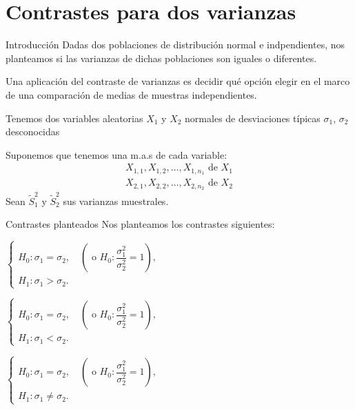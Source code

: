 \documentclass[
  ignorenonframetext,
]{beamer}
\begin{document}
\hypertarget{contrastes-para-dos-varianzas}{%
\section{Contrastes para dos
varianzas}\label{contrastes-para-dos-varianzas}}

\begin{frame}{Introducción}
\protect\hypertarget{introducciuxf3n-4}{}
Dadas dos poblaciones de distribución normal e indpendientes, nos
planteamos si las varianzas de dichas poblaciones son iguales o
diferentes.

Una aplicación del contraste de varianzas es decidir qué opción elegir
en el marco de una comparación de medias de muestras independientes.

Tenemos dos variables aleatorias \(X_1\) y \(X_2\) normales de
desviaciones típicas \(\sigma_1\), \(\sigma_2\) desconocidas

Suponemos que tenemos una m.a.s de cada variable: \[
\begin{array}{l}
X_{1,1}, X_{1,2},\ldots, X_{1,n_1}\mbox{ de }X_1\\
X_{2,1}, X_{2,2},\ldots, X_{2,n_2}\mbox{ de }X_2
\end{array}
\] Sean \(\widetilde{S}_1^2\) y \(\widetilde{S}_2^2\) sus varianzas
muestrales.
\end{frame}

\begin{frame}{Contrastes planteados}
\protect\hypertarget{contrastes-planteados}{}
Nos planteamos los contrastes siguientes:

\(\left\{\begin{array}{l} H_0:\sigma_1=\sigma_2, \quad \left(\mbox{ o } H_0:\dfrac{\sigma_1^2}{\sigma_2^2}=1\right),\\ H_1:\sigma_1 > \sigma_2. \end{array} \right.\)

\(\left\{\begin{array}{l} H_0:\sigma_1=\sigma_2, \quad \left(\mbox{ o } H_0:\dfrac{\sigma_1^2}{\sigma_2^2}=1\right),\\ H_1:\sigma_1 < \sigma_2. \end{array} \right.\)

\(\left\{\begin{array}{l} H_0:\sigma_1=\sigma_2, \quad \left(\mbox{ o } H_0:\dfrac{\sigma_1^2}{\sigma_2^2}=1\right),\\ H_1:\sigma_1 \neq \sigma_2. \end{array} \right.\)
\end{frame}
\end{document}

